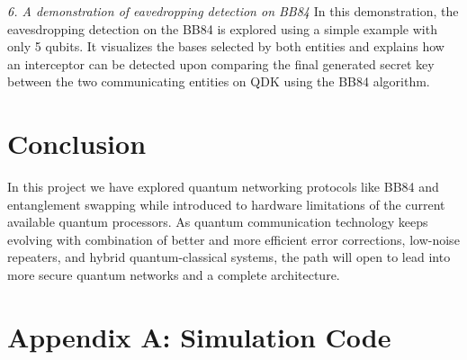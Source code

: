 \documentclass[12pt]{ieeetj}
\begin{document}
\textit{6. A demonstration of eavedropping detection on BB84}
	\newline
	In this demonstration, the eavesdropping detection on the BB84 is explored using a simple example with only 5 qubits.
	It visualizes the bases selected by both entities and explains how an interceptor can be detected upon comparing the final
	generated secret key between the two communicating entities on QDK using the BB84 algorithm.

\section{Conclusion}

	In this project we have explored quantum networking protocols like BB84 and entanglement swapping while introduced to hardware 
	limitations of the current available quantum processors. 
	As quantum communication technology keeps evolving with combination of better and more efficient error corrections, low-noise repeaters, 
	and hybrid quantum-classical systems, the path will open to lead into more secure quantum networks and a complete architecture.

\newpage


\newpage
\appendix

\section{Appendix A: Simulation Code }
\end{document}
